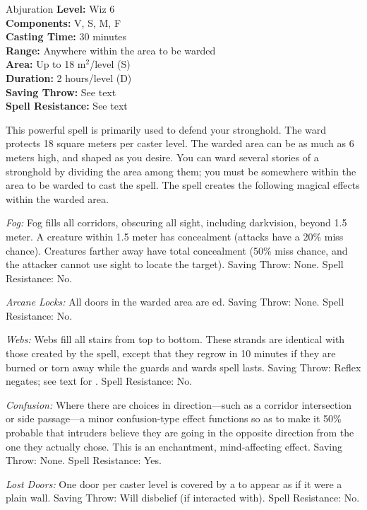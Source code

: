 {Abjuration}
{
	\textbf{Level:}
	Wiz 6\\
	\textbf{Components:}
	V, S, M, F\\
	\textbf{Casting Time:}
	30 minutes\\
	\textbf{Range:}
	Anywhere within the area to be warded\\
	\textbf{Area:}
	Up to 18 m$^2$/level (S)\\
	\textbf{Duration:}
	2 hours/level (D)\\
	\textbf{Saving Throw:}
	See text\\
	\textbf{Spell Resistance:}
	See text\\
}
{
	This powerful spell is primarily used to defend your stronghold. The ward protects 18 square meters per caster level. The warded area can be as much as 6 meters high, and shaped as you desire. You can ward several stories of a stronghold by dividing the area among them; you must be somewhere within the area to be warded to cast the spell. The spell creates the following magical effects within the warded area.

	\textit{Fog:}
	Fog fills all corridors, obscuring all sight, including darkvision, beyond 1.5 meter. A creature within 1.5 meter has concealment (attacks have a 20\% miss chance). Creatures farther away have total concealment (50\% miss chance, and the attacker cannot use sight to locate the target). Saving Throw: None. Spell Resistance: No.

	\textit{Arcane Locks:}
	All doors in the warded area are ed. Saving Throw: None. Spell Resistance: No.

	\textit{Webs:}
	Webs fill all stairs from top to bottom. These strands are identical with those created by the  spell, except that they regrow in 10 minutes if they are burned or torn away while the guards and wards spell lasts. Saving Throw: Reflex negates; see text for . Spell Resistance: No.

	\textit{Confusion:}
	Where there are choices in direction---such as a corridor intersection or side passage---a minor confusion-type effect functions so as to make it 50\% probable that intruders believe they are going in the opposite direction from the one they actually chose. This is an enchantment, mind-affecting effect. Saving Throw: None. Spell Resistance: Yes.

	\textit{Lost Doors:}
	One door per caster level is covered by a  to appear as if it were a plain wall. Saving Throw: Will disbelief (if interacted with). Spell Resistance: No.

}
